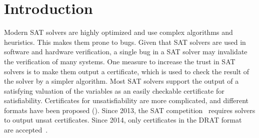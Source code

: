 \documentclass[smallcondensed]{svjour3}     %
\begin{document}
\section{Introduction}
Modern SAT solvers are highly optimized and use complex algorithms and heuristics. This makes them prone to bugs.
Given that SAT solvers are used in software and hardware verification, a single bug in a SAT solver may 
invalidate the verification of many systems.
One measure to increase the trust in SAT solvers is to make them output a certificate, which is used to check 
the result of the solver by a simpler algorithm. 
Most SAT solvers support the output of a satisfying valuation of the variables as an easily checkable certificate for satisfiability.
Certificates for unsatisfiability are more complicated, and different formats have been proposed (\eg \cite{SiBi06,WHH13,WHH14}).
Since 2013, the SAT competition~\cite{satcomp-2013} requires solvers to output unsat certificates.
Since 2014, only certificates in the DRAT format~\cite{WHH14} are accepted~\cite{satcomp-2014}.

\end{document}
